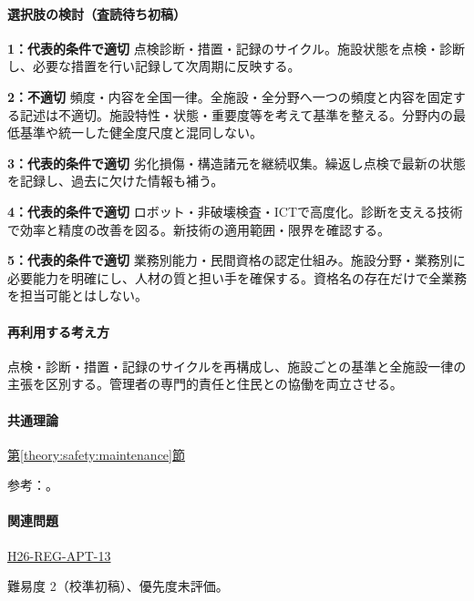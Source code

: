 \paragraph{選択肢の検討（査読待ち初稿）}\mbox{}\par

\noindent\textbf{1：代表的条件で適切} 点検診断・措置・記録のサイクル。施設状態を点検・診断し、必要な措置を行い記録して次周期に反映する。\par

\noindent\textbf{2：不適切} 頻度・内容を全国一律。全施設・全分野へ一つの頻度と内容を固定する記述は不適切。施設特性・状態・重要度等を考えて基準を整える。分野内の最低基準や統一した健全度尺度と混同しない。\par

\noindent\textbf{3：代表的条件で適切} 劣化損傷・構造諸元を継続収集。繰返し点検で最新の状態を記録し、過去に欠けた情報も補う。\par

\noindent\textbf{4：代表的条件で適切} ロボット・非破壊検査・ICTで高度化。診断を支える技術で効率と精度の改善を図る。新技術の適用範囲・限界を確認する。\par

\noindent\textbf{5：代表的条件で適切} 業務別能力・民間資格の認定仕組み。施設分野・業務別に必要能力を明確にし、人材の質と担い手を確保する。資格名の存在だけで全業務を担当可能とはしない。\par

\paragraph{再利用する考え方} 点検・診断・措置・記録のサイクルを再構成し、施設ごとの基準と全施設一律の主張を区別する。管理者の専門的責任と住民との協働を両立させる。

\paragraph{共通理論} \hyperref[theory:safety:maintenance]{第\ref*{theory:safety:maintenance}節}

\par 参考：\cite{eng52_infra2014}。

\paragraph{関連問題} \hyperref[q:h26-reg-apt-13]{H26-REG-APT-13}

\par 難易度 2（校準初稿）、優先度未評価。

